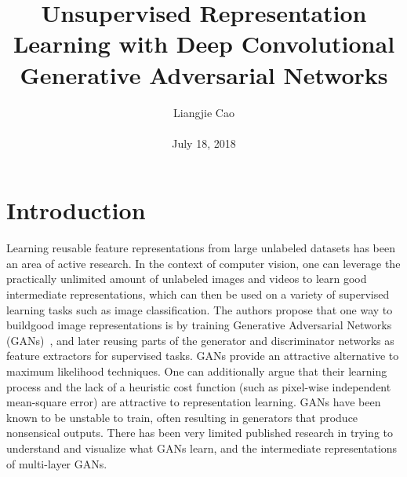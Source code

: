 \documentclass[10pt,twocolumn,letterpaper]{article}
\begin{document}
\title{\textbf{Unsupervised Representation Learning with Deep Convolutional
		Generative Adversarial Networks}}
\author{Liangjie Cao\\\\ July 18, 2018}
\maketitle
{}
\section{Introduction}
Learning reusable feature representations from large unlabeled datasets has been an area of active research. In the context of computer vision, one can leverage the practically unlimited amount of unlabeled images and videos to learn good intermediate representations, which can then be used on
a variety of supervised learning tasks such as image classification. The authors propose that one way to buildgood image representations is by training Generative Adversarial Networks (GANs)~\cite{name1}, and later reusing parts of the generator and discriminator networks as feature extractors for supervised tasks. GANs provide an attractive alternative to maximum likelihood techniques. One can additionally argue that their learning process and the lack of a heuristic cost function (such
as pixel-wise independent mean-square error) are attractive to representation learning. GANs have been known to be unstable to train, often resulting in generators that produce nonsensical outputs.
There has been very limited published research in trying to understand and visualize what GANs learn, and the intermediate representations of multi-layer GANs.
\end{document}
